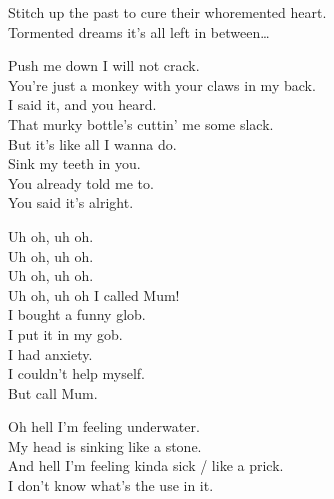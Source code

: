 Stitch up the past to cure their whoremented heart. \\

Tormented dreams it's all left in between… \\




Push me down I will not crack. \\
You're just a monkey with your claws in my back. \\
I said it, and you heard. \\
That murky bottle's cuttin' me some slack. \\

But it's like all I wanna do. \\
Sink my teeth in you. \\
You already told me to. \\
You said it's alright. \\




Uh oh, uh oh. \\
Uh oh, uh oh. \\
Uh oh, uh oh. \\
Uh oh, uh oh I called Mum! \\

I bought a funny glob. \\
I put it in my gob. \\
I had anxiety. \\
I couldn't help myself. \\
But call Mum. \\




Oh hell I'm feeling underwater. \\
My head is sinking like a stone. \\

And hell I'm feeling kinda sick / like a prick. \\
I don't know what's the use in it. \\

